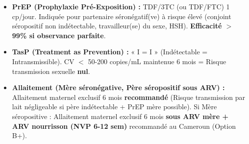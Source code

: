\documentclass[11pt]{article}
\begin{document}
\begin{aretenir}
\begin{itemize}
    \item \textbf{PrEP (Prophylaxie Pré-Exposition) :} TDF/3TC (ou TDF/FTC) 1 cp/jour. Indiquée pour partenaire séronégatif(ve) à risque élevé (conjoint séropositif non indétectable, travailleur(se) du sexe, HSH). \textbf{Efficacité $>$ 99\% si observance parfaite}.
    \item \textbf{TasP (Treatment as Prevention) :} « I = I » (Indétectable = Intransmissible). CV $<$ 50-200 copies/mL maintenue 6 mois = Risque transmission sexuelle \textbf{nul}.
    \item \textbf{Allaitement (Mère séronégative, Père séropositif sous ARV) :} Allaitement maternel exclusif 6 mois \textbf{recommandé} (Risque transmission par lait négligeable si père indétectable + PrEP mère possible). Si Mère séropositive : Allaitement maternel exclusif 6 mois \textbf{sous ARV mère + ARV nourrisson (NVP 6-12 sem)} recommandé au Cameroun (Option B+).
\end{itemize}
\end{aretenir}
\end{document}
